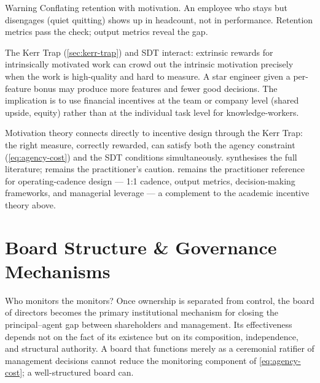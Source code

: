 \begin{admonition}{Warning}
Conflating retention with motivation. An employee who stays but disengages (quiet quitting) shows up in headcount, not in performance. Retention metrics pass the check; output metrics reveal the gap.
\end{admonition}

The Kerr Trap (\cref{sec:kerr-trap}) and SDT interact: extrinsic rewards for intrinsically motivated work can crowd out the intrinsic motivation precisely when the work is high-quality and hard to measure. A star engineer given a per-feature bonus may produce more features and fewer good decisions. The implication is to use financial incentives at the team or company level (shared upside, equity) rather than at the individual task level for knowledge-workers.

Motivation theory connects directly to incentive design through the Kerr Trap: the right measure, correctly rewarded, can satisfy both the agency constraint (\cref{eq:agency-cost}) and the SDT conditions simultaneously. \textcite{robbins2022} synthesises the full literature; \textcite{kerr1975folly} remains the practitioner's caution. \textcite{grove1995high} remains the practitioner reference for operating-cadence design --- 1:1 cadence, output metrics, decision-making frameworks, and managerial leverage --- a complement to the academic incentive theory above.

\section{Board Structure \& Governance Mechanisms}\label{sec:board-governance}

Who monitors the monitors? Once ownership is separated from control, the board of directors
becomes the primary institutional mechanism for closing the principal--agent gap between
shareholders and management. Its effectiveness depends not on the fact of its existence but on
its composition, independence, and structural authority. A board that functions merely as a
ceremonial ratifier of management decisions cannot reduce the monitoring component of
\cref{eq:agency-cost}; a well-structured board can.


